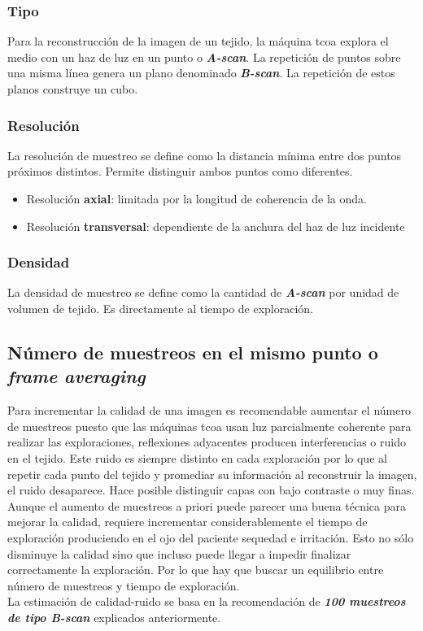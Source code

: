 \subsubsection{Tipo}
Para la reconstrucción de la imagen de un tejido, la máquina
\gls{tcoa} explora el medio con un haz de luz en un punto o
\emph{\textbf{A-scan}}. La repetición de puntos sobre una misma línea
genera un plano denominado \emph{\textbf{B-scan}}. La repetición de
estos planos construye un cubo.
\subsubsection{Resolución}
La resolución de muestreo se define como la distancia mínima entre dos
puntos próximos distintos. Permite distinguir ambos puntos como
diferentes.
\begin{itemize}
\item Resolución \textbf{axial}: limitada por la longitud de
  coherencia de la onda.
\item Resolución \textbf{transversal}: dependiente de la anchura del
  haz de luz incidente
\end{itemize}
\subsubsection{Densidad}
La densidad de muestreo se define como la cantidad de
\emph{\textbf{A-scan}} por unidad de volumen de tejido. Es
directamente al tiempo de exploración.

\subsection{Número de muestreos en el mismo punto o \emph{frame
    averaging}}
Para incrementar la calidad de una imagen es recomendable aumentar el
número de muestreos puesto que las máquinas \gls{tcoa} usan luz
parcialmente coherente para realizar las exploraciones, reflexiones
adyacentes producen interferencias o ruido en el tejido. Este ruido es
siempre distinto en cada exploración por lo que al repetir cada punto
del tejido y promediar su información al reconstruir la imagen, el
ruido desaparece. Hace posible distinguir capas con bajo contraste o
muy finas.\\
Aunque el aumento de muestreos a priori puede parecer una buena
técnica para mejorar la calidad, requiere incrementar
considerablemente el tiempo de exploración produciendo en el ojo del
paciente sequedad e irritación. Esto no sólo disminuye la calidad sino
que incluso puede llegar a impedir finalizar correctamente la
exploración. Por lo que hay que buscar un equilibrio entre número de
muestreos y tiempo de exploración.\\
La estimación de calidad-ruido se basa en la recomendación de
\emph{\textbf{100 muestreos de tipo B-scan}} explicados anteriormente.

